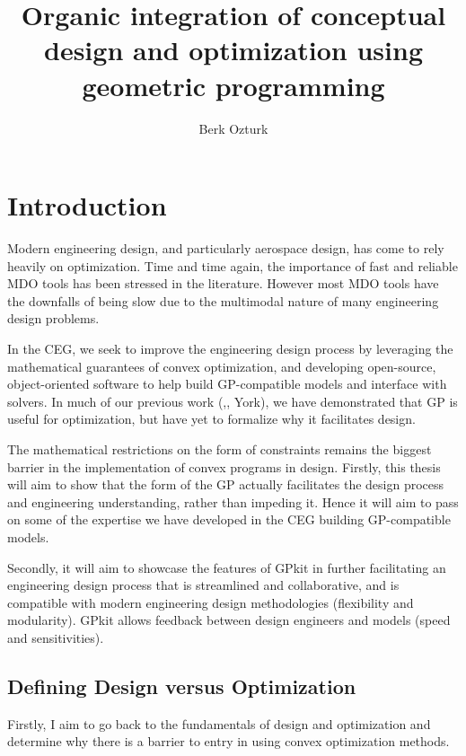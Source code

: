 \documentclass{aiaa-pretty}
\begin{document}
\title{Organic integration of conceptual design and optimization using geometric programming}
\author{Berk Ozturk}
\maketitle

\section{\bf Introduction}

Modern engineering design, and particularly aerospace design, has come to rely heavily on optimization. Time and time again, the importance of fast and reliable MDO tools has been stressed in the literature. However most MDO tools have the downfalls of being slow due to the multimodal nature of many engineering design problems.  
	
In the \gls{CEG}, we seek to improve the engineering design process by leveraging the mathematical guarantees of convex optimization, and developing open-source, object-oriented software to help build GP-compatible models and interface with solvers. In much of our previous work (\cite{gp_ac_design},\cite{SP_ac_design}, York), we have demonstrated that \gls{GP} is useful for optimization, but have yet to formalize why it facilitates design. 
 
The mathematical restrictions on the form of constraints remains the biggest barrier in the implementation of convex programs in design. Firstly, this thesis will aim to show that the form of the GP actually facilitates the design process and engineering understanding, rather than impeding it. Hence it will aim to pass on some of the expertise we have developed in the \gls{CEG} building \gls{GP}-compatible models. 

Secondly, it will aim to showcase the features of GPkit in further facilitating an engineering design process that is streamlined and collaborative, and is compatible with modern engineering design methodologies (flexibility and modularity). GPkit allows feedback between design engineers and models (speed and sensitivities). 

\subsection{Defining Design versus Optimization}

Firstly, I aim to go back to the fundamentals of design and optimization and determine why there is a barrier to entry in using convex optimization methods.
\end{document}
